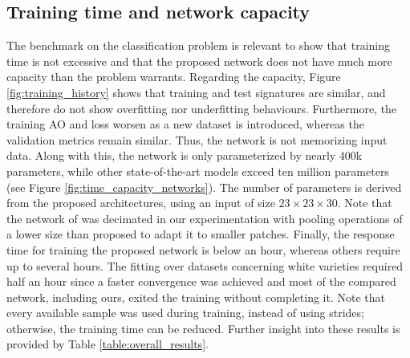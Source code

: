 \subsection{Training time and network capacity}

The benchmark on the classification problem is relevant to show that training time is not excessive and that the proposed network does not have much more capacity than the problem warrants. Regarding the capacity, Figure \ref{fig:training_history} shows that training and test signatures are similar, and therefore do not show overfitting nor underfitting behaviours. Furthermore, the training AO and loss worsen as a new dataset is introduced, whereas the validation metrics remain similar. Thus, the network is not memorizing input data. Along with this, the network is only parameterized by nearly 400k parameters, while other state-of-the-art models exceed ten million parameters (see Figure \ref{fig:time_capacity_networks}). The number of parameters is derived from the proposed architectures, using an input of size $23 \times 23 \times 30$. Note that the network of \cite{lu_hyperspectral_2022} was decimated in our experimentation with pooling operations of a lower size than proposed to adapt it to smaller patches. Finally, the response time for training the proposed network is below an hour, whereas others require up to several hours. The fitting over datasets concerning white varieties required half an hour since a faster convergence was achieved and most of the compared network, including ours, exited the training without completing it. Note that every available sample was used during training, instead of using strides; otherwise, the training time can be reduced. Further insight into these results is provided by Table \ref{table:overall_results}.

